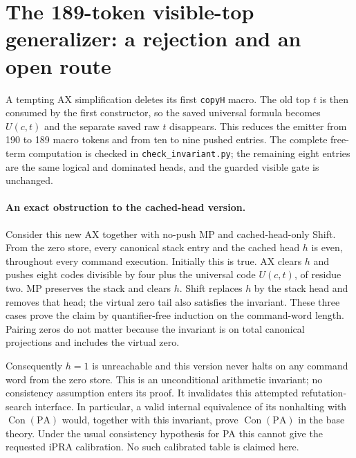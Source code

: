 \section{The 189-token visible-top generalizer: a rejection and an open route}

A tempting AX simplification deletes its first \texttt{copyH} macro.
The old top $t$ is then consumed by the first constructor, so the saved
universal formula becomes $U(c,t)$ and the separate saved raw $t$
disappears. This reduces the emitter from 190 to 189 macro tokens and
from ten to nine pushed entries. The complete free-term computation is
checked in \texttt{check\_invariant.py}; the remaining eight entries are
the same logical and dominated heads, and the guarded visible gate is
unchanged.

\paragraph{An exact obstruction to the cached-head version.}
Consider this new AX together with no-push MP and cached-head-only Shift.
From the zero store, every canonical stack entry and the cached head $h$
is even, throughout every command execution. Initially this is true.
AX clears $h$ and pushes eight codes divisible by four plus the universal
code $U(c,t)$, of residue two. MP preserves the stack and clears $h$.
Shift replaces $h$ by the stack head and removes that head; the virtual
zero tail also satisfies the invariant. These three cases prove the
claim by quantifier-free induction on the command-word length. Pairing
zeros do not matter because the invariant is on total canonical
projections and includes the virtual zero.

Consequently $h=1$ is unreachable and this version never halts on any
command word from the zero store. This is an unconditional arithmetic
invariant; no consistency assumption enters its proof. It invalidates
this attempted refutation-search interface. In particular, a valid
internal equivalence of its nonhalting with $\operatorname{Con}(\mathrm{PA})$
would, together with this invariant, prove $\operatorname{Con}(\mathrm{PA})$
in the base theory. Under the usual consistency hypothesis for PA this
cannot give the requested iPRA calibration. No such calibrated table is
claimed here.

